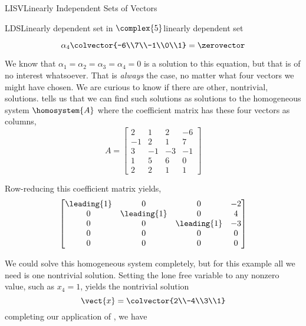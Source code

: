 \begin{subsect}{LISV}{Linearly Independent Sets of Vectors}
\begin{example}{LDS}{Linearly dependent set in $\complex{5}$}{linearly dependent set}
\begin{para}
\begin{equation*}
\alpha_4\colvector{-6\\7\\-1\\0\\1}
=\zerovector
\end{equation*}
\end{para}
%
\begin{para}We know that $\alpha_1=\alpha_2=\alpha_3=\alpha_4=0$ is a solution to this equation, but that is of no interest whatsoever.  That is {\em always} the case, no matter what four vectors we might have chosen.  We are curious to know if there are other, nontrivial, solutions.   tells us that we can find such solutions as solutions to the homogeneous system $\homosystem{A}$ where the coefficient matrix has these four vectors as columns,
%
\begin{equation*}
A=
\begin{bmatrix}
2&1&2&-6\\
-1&2&1&7\\
3&-1&-3&-1\\
1&5&6&0\\
2&2&1&1
\end{bmatrix}
\end{equation*}
\end{para}
%
\begin{para}Row-reducing this coefficient matrix yields,
%
\begin{equation*}
\begin{bmatrix}
\leading{1}&0&0&-2\\
0&\leading{1}&0&4\\
0&0&\leading{1}&-3\\
0&0&0&0\\
0&0&0&0
\end{bmatrix}
\end{equation*}
\end{para}
%
\begin{para}We could solve this homogeneous system completely, but for this example all we need is one nontrivial solution.  Setting the lone free variable to any nonzero value, such as $x_4=1$, yields the nontrivial solution
%
\begin{equation*}
\vect{x}=\colvector{2\\-4\\3\\1}
\end{equation*}
%
completing our application of , we have
%
\begin{equation*}

\end{equation*}
\end{para}
\end{example}
\end{subsect}
